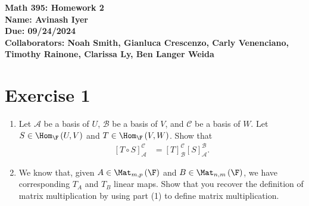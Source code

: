 \documentclass[12pt]{mypackage}
\begin{document}
\RaggedRight
\begin{center}
  \bfseries
  Math 395: Homework 2\\
  Name: Avinash Iyer\\
  Due: 09/24/2024\\
  Collaborators: Noah Smith, Gianluca Crescenzo, Carly Venenciano, Timothy Rainone, Clarissa Ly, Ben Langer Weida
\end{center}
\section{Exercise 1}%
\begin{problem}\hfill
  \begin{enumerate}[(1)]
    \item Let $\mathcal{A}$ be a basis of $U$, $\mathcal{B}$ be a basis of $V$, and $\mathcal{C}$ be a basis of $W$. Let $S\in \Hom_{\F}\left(U,V\right)$ and $T\in \Hom_{\F}\left(V,W\right)$. Show that
      \begin{align*}
        \left[T\circ S\right]_{\mathcal{A}}^{\mathcal{C}} &= \left[T\right]_{\mathcal{B}}^{\mathcal{C}}\left[S\right]_{\mathcal{A}}^{\mathcal{B}}.
      \end{align*}
    \item We know that, given $A\in \Mat_{m,p}\left(\F\right)$ and $B\in \Mat_{n,m}\left(\F\right)$, we have corresponding $T_A$ and $T_B$ linear maps. Show that you recover the definition of matrix multiplication by using part (1) to define matrix multiplication.
  \end{enumerate}
\end{problem}
\end{document}
